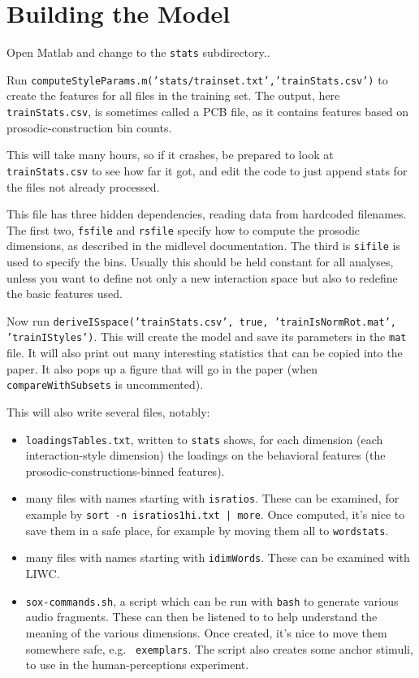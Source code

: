 \documentclass[11pt]{article}
\begin{document}
\section{Building the Model}

Open Matlab and change to the {\tt stats} subdirectory.. 

Run {\tt computeStyleParams.m('stats/trainset.txt','trainStats.csv')}
to create the features for all files in the training set.  The output,
here {\tt trainStats.csv}, is sometimes called a PCB file, as it
contains features based on prosodic-construction bin counts.

This will take many hours, so if it crashes, be prepared to look at
{\tt trainStats.csv} to see how far it got, and edit the code to just
append stats for the files not already processed.

This file has three hidden dependencies, reading data from hardcoded
filenames.  The first two, {\tt fsfile} and {\tt rsfile} specify how
to compute the prosodic dimensions, as described in the midlevel
documentation. The third is {\tt sifile} is used to specify the
bins. Usually this should be held constant for all analyses, unless
you want to define not only a new interaction space but also to
redefine the basic features used. 

\medskip
Now run {\tt deriveISspace('trainStats.csv', true,
  'trainIsNormRot.mat', 'trainIStyles')}. This will create the model
and save its parameters in the {\tt mat} file. It will also print out
many interesting statistics that can be copied into the paper.  It
also pops up a figure that will go in the paper (when {\tt
  compareWithSubsets} is uncommented).

This will also write several files, notably:

\begin{itemize}   \setlength{\itemsep}{0pt}\setlength{\parskip}{0pt}
\item {\tt loadingsTables.txt}, written to {\tt stats} shows, for each
  dimension (each interaction-style dimension) the loadings on the
  behavioral features (the prosodic-constructions-binned features).
\item many files with names starting with {\tt isratios}.  These can
  be examined, for example by {\tt sort -n isratios1hi.txt | more}.
  Once computed, it's nice to save them in a safe place, for example
  by moving them all to {\tt wordstats}. 
\item many files with names starting with {\tt idimWords}.  These can
  be examined with LIWC.
\item {\tt sox-commands.sh}, a script which can be run with {\tt bash}
  to generate various audio fragments.  These can then be listened to
  to help understand the meaning of the various dimensions.  Once
  created, it's nice to move them somewhere safe, e.g. {\tt
    exemplars}.  The script also creates some anchor stimuli, to use
  in the human-perceptions experiment. 
\end{itemize}
\end{document}
